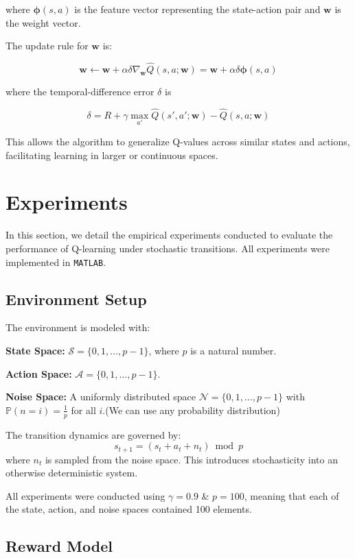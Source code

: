 \documentclass[10pt,twocolumn,letterpaper]{article}
\begin{document}
where \(\boldsymbol{\phi}(s, a)\) is the feature vector representing the state-action pair and \(\boldsymbol{w}\) is the weight vector.

The update rule for \(\boldsymbol{w}\) is:

\[
\boldsymbol{w} \leftarrow \boldsymbol{w} + \alpha \delta \nabla_{\boldsymbol{w}} \hat{Q}(s, a; \boldsymbol{w}) = \boldsymbol{w} + \alpha \delta \boldsymbol{\phi}(s, a)
\]

where the temporal-difference error \(\delta\) is

\[
\delta = R + \gamma \max_{a'} \hat{Q}(s', a'; \boldsymbol{w}) - \hat{Q}(s, a; \boldsymbol{w})
\]

This allows the algorithm to generalize Q-values across similar states and actions, facilitating learning in larger or continuous spaces.


\section{Experiments}

In this section, we detail the empirical experiments conducted to evaluate the performance of Q-learning under stochastic transitions. All experiments were implemented in \texttt{MATLAB}.

\subsection*{Environment Setup}

The environment is modeled with:

    
\textbf{State Space:} $\mathcal{S} = \{0, 1, \dots, p-1\}$, where $p$ is a natural number.
    
\textbf{Action Space:} $\mathcal{A} = \{0, 1, \dots, p-1\}$.
    
\textbf{Noise Space:} A uniformly distributed space $\mathcal{N} = \{0, 1, \dots, p-1\}$ with $\mathbb{P}(n = i) = \frac{1}{p}$ for all $i$.(We can use any probability distribution)


The transition dynamics are governed by:
\[
s_{t+1} = (s_t + a_t + n_t) \bmod p
\]
where $n_t$ is sampled from the noise space. This introduces stochasticity into an otherwise deterministic system.

All experiments were conducted using $\gamma = 0.9$ \& $p = 100$, meaning that each of the state, action, and noise spaces contained 100 elements.

\subsection*{Reward Model}
\end{document}
